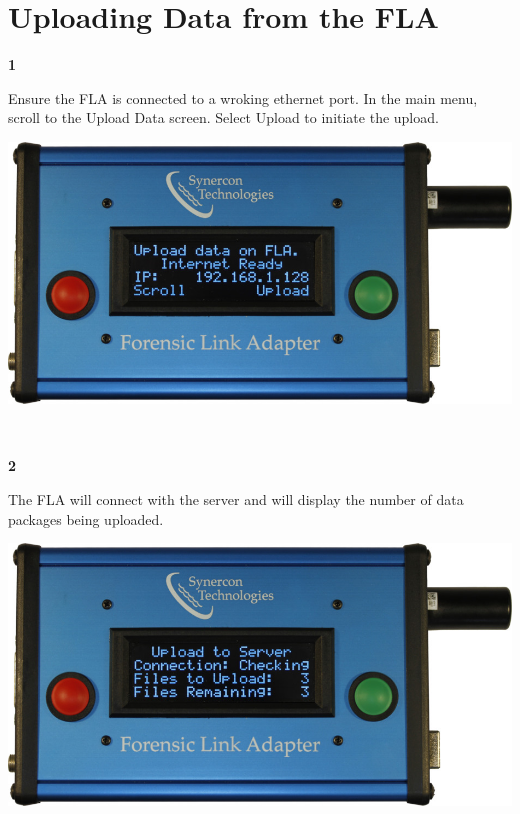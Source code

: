 \documentclass[11pt, oneside]{book}
\begin{document}
\section{Uploading Data from the FLA}
\label{subsec:upload_data}
\noindent\begin{minipage}{0.45\textwidth}%
\begin{center}
\textbf{1}\\[\baselineskip]
\end{center}
Ensure the FLA is connected to a wroking ethernet port. In the main menu, scroll to the Upload Data screen. Select Upload to initiate the upload.
\end{minipage}%
\hfill%
\begin{minipage}{0.45\textwidth}
\includegraphics[width=\linewidth]{../media/fla_screens/ethernet_and_others/main/upload_data}
\end{minipage}
\\[\baselineskip]
\noindent\begin{minipage}{0.45\textwidth}%
\begin{center}
\textbf{2}\\[\baselineskip]
\end{center}
The FLA will connect with the server and will display the number of data packages being uploaded.
\end{minipage}%
\hfill%
\begin{minipage}{0.45\textwidth}
\includegraphics[width=\linewidth]{../media/fla_screens/ethernet_and_others/main/upload_data_checking}
\end{minipage}
\end{document}
